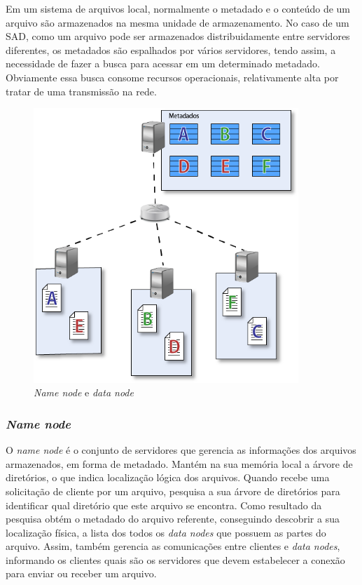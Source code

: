 	Em um sistema de arquivos local, normalmente o metadado e o conteúdo de um arquivo são armazenados na mesma unidade de armazenamento. No caso de um SAD, como um arquivo pode ser armazenados distribuidamente entre servidores diferentes, os metadados são espalhados por vários servidores, tendo assim, a necessidade de fazer a busca para acessar em um determinado metadado. Obviamente essa busca consome recursos operacionais, relativamente alta por tratar de uma transmissão na rede.   
	\begin{figure}[htb]
		\begin{center}
			
			\includegraphics[clip,width=10.0cm]{images/image7.png}
			\caption{\textit{Name node} e \textit{data node}}
			\label{fig:namenode}
		\end{center}
	\end{figure}
	
	\subsubsection{\textit{Name node}}
	
	O \textit{name node} é o conjunto de servidores que gerencia as informações dos arquivos armazenados, em forma de metadado.
	Mantém na sua memória local a árvore de diretórios, o que indica localização lógica dos arquivos. Quando recebe uma solicitação de cliente por um arquivo, pesquisa a sua árvore de diretórios para identificar qual diretório que este arquivo se encontra. Como resultado da pesquisa obtém o metadado do arquivo referente, conseguindo descobrir a sua localização física, a lista dos todos os \textit{data nodes} que possuem as partes do arquivo. Assim, também gerencia as comunicações entre clientes e \textit{data nodes}, informando os clientes quais são os servidores que devem estabelecer a conexão para enviar ou receber um arquivo. 
	\\
	
